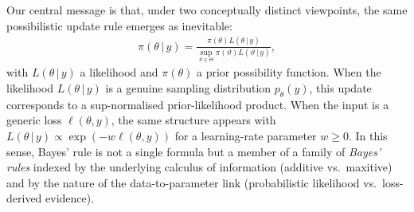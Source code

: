 \documentclass[accepted]{uai2026} %
\def\given{\,|\,}
\theoremstyle{remark}
\begin{document}
Our central message is that, under two conceptually distinct viewpoints, the same possibilistic update rule emerges as inevitable:
\begin{align}
\label{eq:maxBayesRule}
\pi(\theta\given y) = \frac{\pi(\theta) L(\theta\given y)}{\sup_{\vartheta\in\Theta}\pi(\vartheta) L(\vartheta\given y)},
\end{align}
with $L(\theta\given y)$ a likelihood and $\pi(\theta)$ a prior possibility function. When the likelihood $L(\theta\given y)$ is a genuine sampling distribution $p_{\theta}(y)$, this update corresponds to a sup-normalised prior-likelihood product. When the input is a generic loss $\ell(\theta,y)$, the same structure appears with $L(\theta\given y)\propto \exp(-w\ell(\theta,y))$ for a learning-rate parameter $w \geq 0$. In this sense, Bayes' rule is not a single formula but a member of a family of \emph{Bayes' rules} indexed by the underlying calculus of information (additive vs.\ maxitive) and by the nature of the data-to-parameter link (probabilistic likelihood vs.\ loss-derived evidence).
\end{document}

